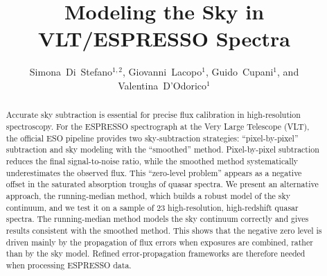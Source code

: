 \documentclass[11pt,twoside]{article}
\begin{document}
\title{Modeling the Sky in VLT/ESPRESSO Spectra}

\author{Simona~Di~Stefano$^{1,2}$, Giovanni~Lacopo$^1$, Guido~Cupani$^1$, and Valentina~D'Odorico$^1$}



\begin{abstract}
Accurate sky subtraction is essential for precise flux calibration in high-resolution spectroscopy. For the ESPRESSO spectrograph at the Very Large Telescope (VLT), the official ESO pipeline provides two sky-subtraction strategies: ``pixel-by-pixel'' subtraction and sky modeling with the ``smoothed'' method. Pixel-by-pixel subtraction reduces the final signal-to-noise ratio, while the smoothed method systematically underestimates the observed flux. This ``zero-level problem'' appears as a negative offset in the saturated absorption troughs of quasar spectra. We present an alternative approach, the running-median method, which builds a robust model of the sky continuum, and we test it on a sample of 23 high-resolution, high-redshift quasar spectra. The running-median method models the sky continuum correctly and gives results consistent with the smoothed method. This shows that the negative zero level is driven mainly by the propagation of flux errors when exposures are combined, rather than by the sky model. Refined error-propagation frameworks are therefore needed when processing ESPRESSO data.
\end{abstract}
\end{document}
